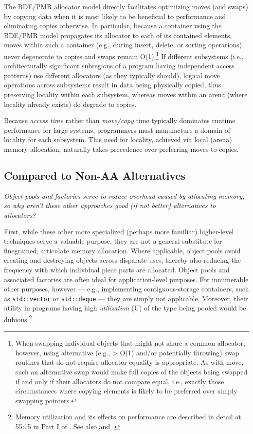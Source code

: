 The BDE/PMR allocator model directly facilitates optimizing moves (and swaps) by
copying data when it is most likely to be beneficial to performance and eliminating
copies otherwise. In particular, because a container using the BDE/PMR model
propagates its allocator to each of its contained elements, moves within such a
container (e.g., during insert, delete, or sorting operations) never degenerate to
copies and swaps remain O(1).\footnote{When swapping individual objects that might not share a common allocator, however, using
alternative (e.g., > O(1) and/or potentially throwing) swap routines that do not require allocator
equality is appropriate. As with move, such an alternative swap would make full copies of the objects
being swapped if and only if their allocators do not compare equal, i.e., exactly those circumstances
where copying elements is likely to be preferred over simply swapping pointers.}
If different subsystems (i.e., architecturally
significant subregions of a program having independent access patterns) use
different allocators (as they typically should), logical move operations across
subsystems result in data being physically copied, thus preserving locality within
each subsystem, whereas moves within an arena (where locality already exists) do
degrade to copies.

Because \emph{access time} rather than \emph{move/copy} time typically dominates runtime
performance for large systems, programmers must manufacture a domain of locality
for each subsystem. This need for locality, achieved via local (arena) memory
allocation, naturally takes precedence over preferring moves to copies.

\subsection{Compared to Non-AA Alternatives}
\emph{Object pools and factories serve to reduce overhead caused by allocating memory, so
  why aren’t these other approaches good (if not better) alternatives to allocators?}

First, while these other more specialized (perhaps more familiar) higher-level
techniques serve a valuable purpose, they are not a general substitute for finegrained, articulate memory allocation. Where applicable, object pools avoid creating
and destroying objects across disparate uses, thereby also reducing the frequency
with which individual piece parts are allocated. Object pools and associated factories
are often ideal for application-level purposes. For innumerable other purposes,
however — e.g., implementing contiguous-storage containers, such as \lstinline{std::vector}
or \lstinline{std::deque} — they are simply not applicable. Moreover, their utility in programs
having high \emph{utilization} (U) of the type being pooled would be dubious.\footnote{Memory utilization and its effects on performance are described in detail at 55:15 in Part I of
\cite{lakos17b}. See also \cite{lakos16} and \cite{bleaney16}.}

